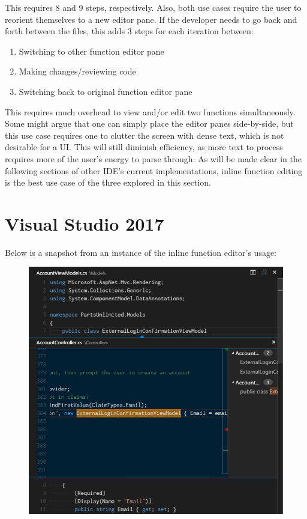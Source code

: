 \documentclass[]{report}
\begin{document}
		This requires 8 and 9 steps, respectively.  Also, both use cases require the user to reorient themselves to a new editor pane.  If the developer needs to go back and forth between the files, this adds 3 steps for each iteration between:
		
			\begin{enumerate}
				\item
				Switching to other function editor pane
				
				\item
				Making changes/reviewing code
				
				\item 
				Switching back to original function editor pane
			\end{enumerate}

		This requires much overhead to view and/or edit two functions simultaneously.  Some might argue that one can simply place the editor panes side-by-side, but this use case requires one to clutter the screen with dense text, which is not desirable for a UI.  This will still diminish efficiency, as more text to process requires more of the user's energy to parse through.  As will be made clear in the following sections of other IDE's current implementations, inline function editing is the best use case of the three explored in this section.

	\newpage
	
	\section{Visual Studio 2017}

		Below is a snapshot from an instance of the inline function editor's usage:
		
		\begin{figure}[h!]
			\includegraphics[width=\linewidth]{imgs/vs_peek_function.png}
		\end{figure}
		
\end{document}
